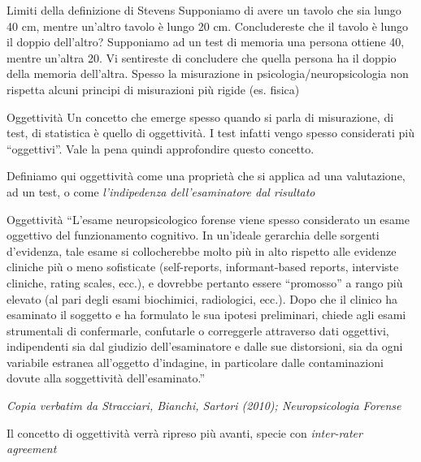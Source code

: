 \documentclass[
  ignorenonframetext,
]{beamer}
\begin{document}
\begin{frame}{Limiti della definizione di Stevens}
\label{limiti-della-definizione-di-stevens-1}
Supponiamo di avere un tavolo che sia lungo 40 cm, mentre un'altro
tavolo è lungo 20 cm. Concludereste che il tavolo è lungo il doppio
dell'altro? \pause \vspace{2em} Supponiamo ad un test di memoria una
persona ottiene 40, mentre un'altra 20. Vi sentireste di concludere che
quella persona ha il doppio della memoria dell'altra. \pause
\vspace{2em} Spesso la misurazione in psicologia/neuropsicologia non
rispetta alcuni principi di misurazioni più rigide (es. fisica)
\end{frame}

\begin{frame}{Oggettività}
\label{oggettivituxe0}
Un concetto che emerge spesso quando si parla di misurazione, di test,
di statistica è quello di oggettività. \pause I test infatti vengo
spesso considerati più ``oggettivi''. Vale la pena quindi approfondire
questo concetto.

\pause
\vfill

Definiamo qui oggettività come una proprietà che si applica ad una
valutazione, ad un test, o come \emph{l'indipedenza dell'esaminatore dal
risultato}
\end{frame}

\begin{frame}{Oggettività}
\label{oggettivituxe0-1}
\footnotesize``L'esame neuropsicologico forense viene spesso considerato
un esame oggettivo del funzionamento cognitivo. In un'ideale gerarchia
delle sorgenti d'evidenza, tale esame si collocherebbe molto più in alto
rispetto alle evidenze cliniche più o meno sofisticate (self-reports,
informant-based reports, interviste cliniche, rating scales, ecc.), e
dovrebbe pertanto essere ``promosso'' a rango più elevato (al pari degli
esami biochimici, radiologici, ecc.). Dopo che il clinico ha esaminato
il soggetto e ha formulato le sua ipotesi preliminari, chiede agli esami
strumentali di confermarle, confutarle o correggerle attraverso dati
oggettivi, indipendenti sia dal giudizio dell'esaminatore e dalle sue
distorsioni, sia da ogni variabile estranea all'oggetto d'indagine, in
particolare dalle contaminazioni dovute alla soggettività
dell'esaminato.''

\begin{flushright}
\emph{Copia verbatim da  Stracciari, Bianchi, Sartori (2010); Neuropsicologia Forense}
\end{flushright}

Il concetto di oggettività verrà ripreso più avanti, specie con
\emph{inter-rater agreement}
\end{frame}
\end{document}

